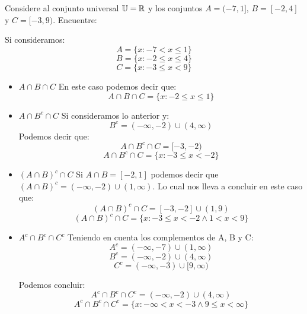 \section{}
Considere al conjunto universal $\mathbb{U} = \mathbb{R}$ y los conjuntos $A = (-7, 1]$, $B = [-2, 4]$ y $C = [-3, 9)$. Encuentre:

Si consideramos: 
	\[ A = \{  x : -7 < x \leqslant 1 \}\]
	\[ B = \{  x : -2 \leqslant x  \leqslant 4\}\]
	\[ C = \{  x : -3 \leqslant x  < 9\}\]
	
\begin{itemize}
	\item $A \cap B \cap C$ \newline
	En este caso podemos decir que:
	\[  A \cap B \cap C = \{ x: -2 \leqslant x \leqslant 1\} \]
	
	
	\item $A \cap B^c \cap C$ \newline
		Si consideramos lo anterior y:
		\[  B^c = (-\infty, -2)  \cup (4, \infty) \]
		Podemos decir que:
		\[ A \cap B^c \cap C = [-3, -2) \]
		\[  A \cap B^c \cap C = \{ x : -3 \leqslant x < -2 \} \]
		
	\item $(A \cap B)^c \cap C$\newline
	Si $A \cap B = [-2, 1]$ podemos decir que $(A \cap B)^c = (-\infty, -2) \cup (1, \infty)$. Lo cual nos lleva a concluir en este caso que:
	\[  (A \cap B)^c \cap C = [-3, -2] \cup (1, 9)\]
	\[ (A \cap B)^c \cap C = \{ x : -3 \leqslant x < -2 \wedge 1 < x < 9 \} \]
	
	\item $A^c \cap B^c \cap C^c$\newline
	Teniendo en cuenta los complementos de A, B y C:
	\[A^c = (-\infty, -7)\cup (1,\infty) \]
	\[  B^c = (-\infty, -2)  \cup (4, \infty) \]
	\[  C^c = (-\infty, -3)\cup [9,\infty) \]
	
	Podemos concluir:
	\[ A^c \cap B^c \cap C^c = (-\infty,-2) \cup (4, \infty)\]
	\[ A^c \cap B^c \cap C^c = \{x : -\infty < x < -3 \wedge 9 \leqslant x < \infty \}\]
\end{itemize}